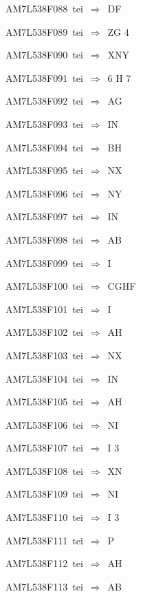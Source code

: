 {\sixrm AM7L538F088\ {\sixit tei}\ }$\Rightarrow$\ DF\par\smallskip
{\sixrm AM7L538F089\ {\sixit tei}\ }$\Rightarrow$\ ZG 4\par\smallskip
{\sixrm AM7L538F090\ {\sixit tei}\ }$\Rightarrow$\ XNY\par\smallskip
{\sixrm AM7L538F091\ {\sixit tei}\ }$\Rightarrow$\ 6 H 7\par\smallskip
{\sixrm AM7L538F092\ {\sixit tei}\ }$\Rightarrow$\ AG\par\smallskip
{\sixrm AM7L538F093\ {\sixit tei}\ }$\Rightarrow$\ IN\par\smallskip
{\sixrm AM7L538F094\ {\sixit tei}\ }$\Rightarrow$\ BH\par\smallskip
{\sixrm AM7L538F095\ {\sixit tei}\ }$\Rightarrow$\ NX\par\smallskip
{\sixrm AM7L538F096\ {\sixit tei}\ }$\Rightarrow$\ NY\par\smallskip
{\sixrm AM7L538F097\ {\sixit tei}\ }$\Rightarrow$\ IN\par\smallskip
{\sixrm AM7L538F098\ {\sixit tei}\ }$\Rightarrow$\ AB\par\smallskip
{\sixrm AM7L538F099\ {\sixit tei}\ }$\Rightarrow$\ I\par\smallskip
{\sixrm AM7L538F100\ {\sixit tei}\ }$\Rightarrow$\ CGHF\par\smallskip
{\sixrm AM7L538F101\ {\sixit tei}\ }$\Rightarrow$\ I\par\smallskip
{\sixrm AM7L538F102\ {\sixit tei}\ }$\Rightarrow$\ AH\par\smallskip
{\sixrm AM7L538F103\ {\sixit tei}\ }$\Rightarrow$\ NX\par\smallskip
{\sixrm AM7L538F104\ {\sixit tei}\ }$\Rightarrow$\ IN\par\smallskip
{\sixrm AM7L538F105\ {\sixit tei}\ }$\Rightarrow$\ AH\par\smallskip
{\sixrm AM7L538F106\ {\sixit tei}\ }$\Rightarrow$\ NI\par\smallskip
{\sixrm AM7L538F107\ {\sixit tei}\ }$\Rightarrow$\ I 3\par\smallskip
{\sixrm AM7L538F108\ {\sixit tei}\ }$\Rightarrow$\ XN\par\smallskip
{\sixrm AM7L538F109\ {\sixit tei}\ }$\Rightarrow$\ NI\par\smallskip
{\sixrm AM7L538F110\ {\sixit tei}\ }$\Rightarrow$\ I 3\par\smallskip
{\sixrm AM7L538F111\ {\sixit tei}\ }$\Rightarrow$\ P\par\smallskip
{\sixrm AM7L538F112\ {\sixit tei}\ }$\Rightarrow$\ AH\par\smallskip
{\sixrm AM7L538F113\ {\sixit tei}\ }$\Rightarrow$\ AB\par\smallskip

